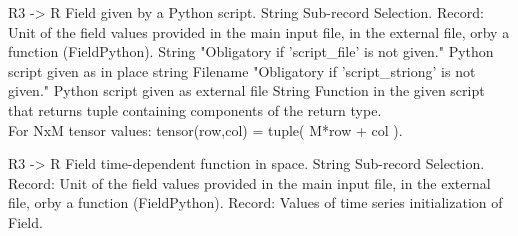 \begin{RecordType}
	{}
	{} %
	{} %
	{} %
	{{{R3 -{\textgreater} R Field given by a Python script.}}}
		\KeyItem
			{}
			{{String}}
			{\textrangle}
			{} %
			{{{Sub-record Selection.}}}
		\KeyItem
			{}
			{{Record}{: }}
			{\textrangle}
			{} %
			{{{Unit of the field values provided in the main input file, in the external file, orby a function (FieldPython).}}}
		\KeyItem
			{}
			{{String}}
			{"{Obligatory if 'script{\_}file' is not given.}"}
			{} %
			{{{Python script given as in place string}}}
		\KeyItem
			{}
			{{Filename}}
			{"{Obligatory if 'script{\_}striong' is not given.}"}
			{} %
			{{{Python script given as external file}}}
		\KeyItem
			{}
			{{String}}
			{\textrangle}
			{} %
			{{{Function in the given script that returns tuple containing components of the return type.}\\{
For NxM tensor values: tensor(row,col) = tuple( M*row + col ).}}}
\end{RecordType}
\begin{RecordType}
	{}
	{} %
	{} %
	{} %
	{{{R3 -{\textgreater} R Field time-dependent function in space.}}}
		\KeyItem
			{}
			{{String}}
			{\textrangle}
			{} %
			{{{Sub-record Selection.}}}
		\KeyItem
			{}
			{{Record}{: }}
			{\textrangle}
			{} %
			{{{Unit of the field values provided in the main input file, in the external file, orby a function (FieldPython).}}}
		\KeyItem
			{}
			{{Record}{: }}
			{\textrangle}
			{} %
			{{{Values of time series initialization of Field.}}}
\end{RecordType}
